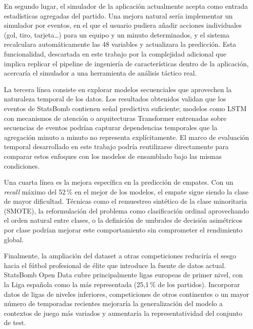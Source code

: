 En segundo lugar, el simulador de la aplicación actualmente acepta como entrada estadísticas agregadas del partido. Una mejora natural sería implementar un simulador por eventos, en el que el usuario pudiera añadir acciones individuales (gol, tiro, tarjeta…) para un equipo y un minuto determinados, y el sistema recalculara automáticamente las 48 variables y actualizara la predicción. Esta funcionalidad, descartada en este trabajo por la complejidad adicional que implica replicar el pipeline de ingeniería de características dentro de la aplicación, acercaría el simulador a una herramienta de análisis táctico real.

La tercera línea consiste en explorar modelos secuenciales que aprovechen la naturaleza temporal de los datos. Los resultados obtenidos validan que los eventos de StatsBomb contienen señal predictiva suficiente; modelos como LSTM con mecanismos de atención \citep{zhang2022lstm} o arquitecturas Transformer entrenadas sobre secuencias de eventos \citep{simpson2022seq2event} podrían capturar dependencias temporales que la agregación minuto a minuto no representa explícitamente. El marco de evaluación temporal desarrollado en este trabajo podría reutilizarse directamente para comparar estos enfoques con los modelos de ensamblado bajo las mismas condiciones.

Una cuarta línea es la mejora específica en la predicción de empates. Con un \textit{recall} máximo del 52\,\% en el mejor de los modelos, el empate sigue siendo la clase de mayor dificultad. Técnicas como el remuestreo sintético de la clase minoritaria (SMOTE), la reformulación del problema como clasificación ordinal aprovechando el orden natural entre clases, o la definición de umbrales de decisión asimétricos por clase podrían mejorar este comportamiento sin comprometer el rendimiento global.

Finalmente, la ampliación del dataset a otras competiciones reduciría el sesgo hacia el fútbol profesional de élite que introduce la fuente de datos actual. StatsBomb Open Data cubre principalmente ligas europeas de primer nivel, con la Liga española como la más representada (25,1\,\% de los partidos). Incorporar datos de ligas de niveles inferiores, competiciones de otros continentes o un mayor número de temporadas recientes mejoraría la generalización del modelo a contextos de juego más variados y aumentaría la representatividad del conjunto de test.
